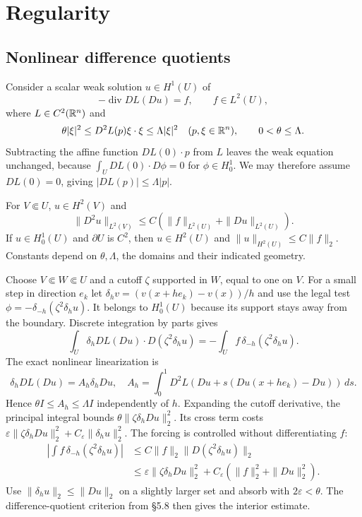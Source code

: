 \Needspace{55mm}
\section{Regularity}
\label{sec:8-3}
\Needspace{45mm}
\subsection{Nonlinear difference quotients}
Consider a scalar weak solution $u\in H^1(U)$ of
\begin{equation}\label{eq:8-nonlinear-elliptic}
 -\operatorname{div}DL(Du)=f,\qquad f\in L^2(U),
\end{equation}
where $L\in C^2(\mathbb{R}^n)$ and
\begin{equation}\label{eq:8-uniform-hessian}
 \theta|\xi|^2\leq D^2L(p)\xi\cdot\xi\leq\Lambda|\xi|^2
 \quad(p,\xi\in\mathbb{R}^n),\qquad0<\theta\leq\Lambda.
\end{equation}
Subtracting the affine function $DL(0)\cdot p$ from $L$ leaves the weak
equation unchanged, because $\int_U DL(0)\cdot D\phi=0$ for
$\phi\in H^1_0$. We may therefore assume $DL(0)=0$, giving
$|DL(p)|\leq\Lambda|p|$.
\Needspace{55mm}
\begin{theorem}
\label{thm:8-H2}
For $V\Subset U$, $u\in H^2(V)$ and
\[
 \|D^2u\|_{L^2(V)}\leq C(\|f\|_{L^2(U)}+\|Du\|_{L^2(U)}).
\]
If $u\in H^1_0(U)$ and $\partial U$ is $C^2$, then
$u\in H^2(U)$ and $\|u\|_{H^2(U)}\leq C\|f\|_2$.
Constants depend on $\theta,\Lambda$, the domains and their indicated geometry.
\end{theorem}
\begin{expandedproof}
Choose $V\Subset W\Subset U$ and a cutoff $\zeta$ supported in $W$,
equal to one on $V$. For a small step in direction $e_k$ let
$\delta_hv=(v(x+he_k)-v(x))/h$ and use the legal test
$\phi=-\delta_{-h}(\zeta^2\delta_hu)$.
It belongs to $H^1_0(U)$ because its support stays away from the boundary.
Discrete integration by parts gives
\[
 \int_U\delta_hDL(Du)\cdot D(\zeta^2\delta_hu)
 =-\int_U f\,\delta_{-h}(\zeta^2\delta_hu).
\]
The exact nonlinear linearization is
\[
 \delta_hDL(Du)=A_h\delta_hDu,\quad
 A_h=\int_0^1D^2L(Du+s(Du(x+he_k)-Du))\,ds.
\]
Hence $\theta I\leq A_h\leq\Lambda I$ independently of $h$.
Expanding the cutoff derivative, the principal integral bounds
$\theta\|\zeta\delta_hDu\|_2^2$. Its cross term costs
$\varepsilon\|\zeta\delta_hDu\|_2^2+C_\varepsilon\|\delta_hu\|_2^2$.
The forcing is controlled without differentiating $f$:
\[
 \begin{split}
 \left|\int f\,\delta_{-h}(\zeta^2\delta_hu)\right|
 &\leq C\|f\|_2\|D(\zeta^2\delta_hu)\|_2\\
 &\leq\varepsilon\|\zeta\delta_hDu\|_2^2+
 C_\varepsilon(\|f\|_2^2+\|Du\|_2^2).
 \end{split}
\]
Use $\|\delta_hu\|_2\leq\|Du\|_2$ on a slightly larger set and absorb
with $2\varepsilon<\theta$. The difference-quotient criterion from
\S5.8 then gives the interior estimate.
\end{expandedproof}

